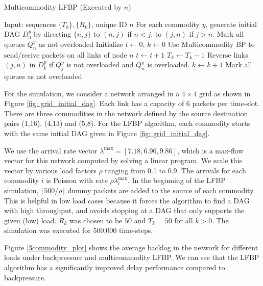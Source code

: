 \documentclass{sig-alternate-2013}
\begin{document}
\begin{algorithm}[h] 
\caption{Multicommodity LFBP (Executed by $n$)}
\label{alg:mlfbp}
\begin{algorithmic}[1]
\State Input: sequences $\{T_k\}, \{R_k\}$, unique ID $n$
\State For each commodity $y$, generate initial DAG $D_0^y$ by directing $\{n,j\}$ to $(n,j)$ if $n<j$, to $(j,n)$ if $j>n$.
\State Mark all queues $Q_n^y$ as not overloaded
\State Initialize $t \gets 0$, $k \gets 0$
	\State Use Multicommodity BP to send/recive packets on all links of node $n$
		  \EndIf
	\EndFor
	\State $t \gets t+1$
\State	
	\State $T_k \gets T_k-1$
			\State Reverse links $(j,n)$ in $D_k^y$ if $Q_j^y$ is not overloaded and $Q_n^y$ is overloaded.
		\EndFor
		\State $k\gets k+1$
		\State Mark all queues as not overloaded
	\EndIf
	
\EndWhile
\end{algorithmic}
\end{algorithm}

For the simulation, we consider a network arranged in a $4\times 4$ grid as shown in Figure \ref{fig: grid_initial_dag}. Each link has a capacity of 6 packets per time-slot. There are three commodities in the network defined by the source destination pairs (1,16), (4,13) and (5,8). For the LFBP algorithm, each commodity starts with the same initial DAG given in Figure \ref{fig: grid_initial_dag}. 

We use the arrival rate vector $\lambda^{\max} = [7.18,6.96,9.86]$, which is a max-flow vector for this network computed by solving a linear program. We scale this vector by various load factors $\rho$ ranging from 0.1 to 0.9. The arrivals for each commodity $i$ is Poisson with rate $\rho \lambda^{\max}_i$. In the beginning of the LFBP simulation, $\lfloor 500/\rho \rfloor$ dummy packets are added to the source of each commodity. This is helpful in low load cases because it forces the algorithm to find a DAG with high throughput, and avoids stopping at a DAG that only supports the given (low) load. $R_k$ was chosen to be $50$ and $T_k = 50$ for all $k>0$. The simulation was executed for 500,000 time-steps.

Figure \ref{3commodity_plot} shows the average backlog in the network for different loads under backpressure and multicommodity LFBP. We can see that the LFBP algorithm has a significantly improved delay performance compared to backpressure.
\end{document}
